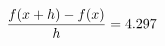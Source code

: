 \documentclass[preview]{standalone}
\begin{document}
\begin{align*}
\special{dvisvgm:raw <g id='unique000'>}\frac{f(x+h)-f(x)}{h} = 4.297\special{dvisvgm:raw </g>}
\end{align*}
\end{document}
